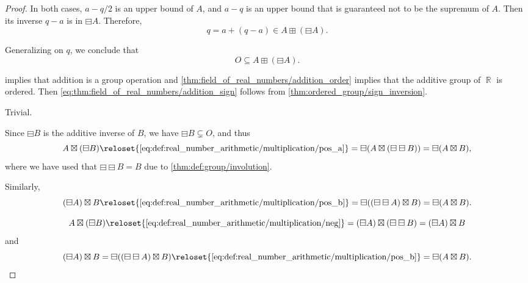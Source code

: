 \begin{proof}
  In both cases, \( a - q/2 \) is an upper bound of \( A \), and \( a - q \) is an upper bound that is guaranteed not to be the supremum of \( A \). Then its inverse \( q - a \) is in \( \boxminus A \). Therefore,
  \begin{equation*}
    q = a + (q - a) \in A \boxplus (\boxminus A).
  \end{equation*}

  Generalizing on \( q \), we conclude that
  \begin{equation*}
    O \subseteq A \boxplus (\boxminus A).
  \end{equation*}

    implies that addition is a group operation and \cref{thm:field_of_real_numbers/addition_order} implies that the additive group of \( \BbbR \) is ordered. Then \eqref{eq:thm:field_of_real_numbers/addition_sign} follows from \cref{thm:ordered_group/sign_inversion}.


   Trivial.

   Since \( \boxminus B \) is the additive inverse of \( B \), we have \( \boxminus B \subsetneq O \), and thus
  \begin{equation*}
    A \boxtimes (\boxminus B)
    \reloset {\eqref{eq:def:real_number_arithmetic/multiplication/pos_a}} =
    \boxminus(A \boxtimes (\boxminus\boxminus B))
    =
    \boxminus(A \boxtimes B),
  \end{equation*}
  where we have used that \( \boxminus\boxminus B = B \) due to \cref{thm:def:group/involution}.

  Similarly,
  \begin{equation*}
    (\boxminus A) \boxtimes B
    \reloset {\eqref{eq:def:real_number_arithmetic/multiplication/pos_b}} =
    \boxminus((\boxminus\boxminus A) \boxtimes B)
    =
    \boxminus(A \boxtimes B).
  \end{equation*}

  \begin{equation*}
    A \boxtimes (\boxminus B)
    \reloset {\eqref{eq:def:real_number_arithmetic/multiplication/neg}} =
    (\boxminus A) \boxtimes (\boxminus\boxminus B)
    =
    (\boxminus A) \boxtimes B
  \end{equation*}
  and
  \begin{equation*}
    (\boxminus A) \boxtimes B
    =
    \boxminus ((\boxminus\boxminus A) \boxtimes B)
    \reloset {\eqref{eq:def:real_number_arithmetic/multiplication/pos_b}} =
    \boxminus(A \boxtimes B).
  \end{equation*}


\end{proof}
